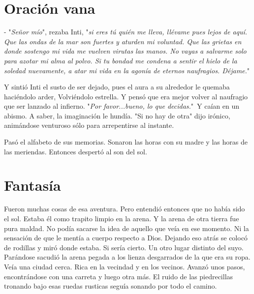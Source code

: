 \chapter{Oración vana}

- "\emph{Señor mío}", rezaba Inti, "\emph{si eres tú quién me lleva, llévame pues lejos de aquí. Que las ondas de la mar son fuertes y aturden mi voluntad. Que las grietas en donde sostengo mi vida me vuelven virutas las manos. No vayas a salvarme solo para azotar mi alma al polvo. Si tu bondad me condena a sentir el hielo de la soledad nuevamente, a atar mi vida en la agonía de eternos naufragios. Déjame.}"

Y sintió Inti el susto de ser dejado, pues el aura a su alrededor le quemaba haciéndolo arder, Volviéndolo estrella. Y pensó que era mejor volver al naufragio que ser lanzado al infierno. "\emph{Por favor...bueno, lo que decidas.}"\, Y caían en un abismo. A saber, la imaginación le hundía. "Si no hay de otra"\: dijo irónico, animándose venturoso sólo para arrepentirse al instante.

Pasó el alfabeto de sus memorias. Sonaron las horas con su madre y las horas de las meriendas. Entonces despertó al son del sol.



\chapter{Fantasía}
Fueron muchas cosas de esa aventura. Pero entendió entonces que no había sido el sol. Estaba él como trapito limpio en la arena. Y la arena de otra tierra fue pura maldad. No podía sacarse la idea de aquello que veía en ese momento. Ni la sensación de que le mentía a cuerpo respecto a Dios. Dejando eso atrás se colocó de rodillas y miró donde estaba. Si sería cierto. Un otro lugar distinto del suyo. Parándose sacudió la arena pegada a los lienza desgarrados de la que era su ropa. Veía una ciudad cerca. Rica en la vecindad y en los vecinos. Avanzó unos pasos, encontrándose con una carreta y luego otra más. El ruido de las piedrecillas tronando bajo esas ruedas rusticas seguía sonando por todo el camino.

